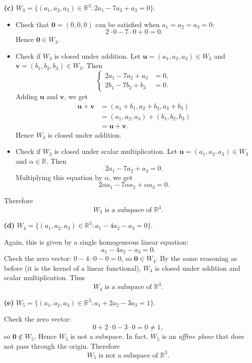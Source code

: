 \documentclass{article}
\begin{document}
\bigskip

\noindent
\textbf{(c)} $W_3 = \{(a_1,a_2,a_3) \in \mathbb{R}^3 : 2a_1 - 7a_2 + a_3 = 0\}$.

\begin{itemize}
\item Check that $\mathbf{0} = (0,0,0)$ can be satisfied when $a_1 = a_2 = a_3 = 0$:
\[
2\cdot 0 - 7\cdot 0 + 0 = 0.
\]
Hence $\mathbf{0} \in W_3$.

\item Check if $W_3$ is closed under addition. Let $\mathbf{u} = (a_1,a_2,a_3) \in W_3$ and $\mathbf{v} = (b_1,b_2,b_3) \in W_3$. Then
\[
\left\{\begin{aligned}
2a_1 - 7a_2 + a_3 &= 0, \\
2b_1 - 7b_2 + b_3 &= 0.
\end{aligned}\right.
\]
Adding $\mathbf{u}$ and $\mathbf{v}$, we get
\begin{align*}
\mathbf{u} + \mathbf{v} &= (a_1 + b_1, a_2 + b_2, a_3 + b_3) \\
&= (a_1, a_2, a_3) + (b_1, b_2, b_3) \\
&= \mathbf{u} + \mathbf{v}.
\end{align*}
Hence $W_3$ is closed under addition.

\item Check if $W_3$ is closed under scalar multiplication. Let $\mathbf{u} = (a_1,a_2,a_3) \in W_3$ and $\alpha \in \mathbb{R}$. Then
\[
2a_1 - 7a_2 + a_3 = 0.
\]
Multiplying this equation by $\alpha$, we get
\[
2\alpha a_1 - 7\alpha a_2 + \alpha a_3 = 0.
\]
\end{itemize}

Therefore
\[
\boxed{W_3 \text{ is a subspace of } \mathbb{R}^3.}
\]

\bigskip

\noindent
\textbf{(d)} $W_4 = \{(a_1,a_2,a_3) \in \mathbb{R}^3 : a_1 - 4a_2 - a_3 = 0\}$.

Again, this is given by a single homogeneous linear equation:
\[
a_1 - 4a_2 - a_3 = 0.
\]
Check the zero vector: $0 - 4\cdot0 - 0 = 0$, so $\mathbf{0}\in W_4$. By the same reasoning as before (it is the kernel of a linear functional), $W_4$ is closed under addition and scalar multiplication. Thus
\[
\boxed{W_4 \text{ is a subspace of } \mathbb{R}^3.}
\]

\bigskip

\noindent
\textbf{(e)} $W_5 = \{(a_1,a_2,a_3) \in \mathbb{R}^3 : a_1 + 2a_2 - 3a_3 = 1\}$.

Check the zero vector:
\[
0 + 2\cdot0 - 3\cdot0 = 0 \neq 1,
\]
so $\mathbf{0}\notin W_5$. Hence $W_5$ is not a subspace. In fact, $W_5$ is an \emph{affine plane} that does not pass through the origin. Therefore
\[
\boxed{W_5 \text{ is not a subspace of } \mathbb{R}^3.}
\]
\end{document}
